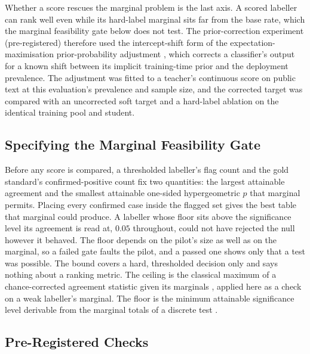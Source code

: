 Whether a score rescues the marginal problem is the last axis. A scored labeller can rank well
even while its hard-label marginal sits far from the base rate, which the marginal feasibility gate
below does not test. The prior-correction experiment (pre-registered) therefore used the
intercept-shift form of the expectation-maximisation prior-probability adjustment
\citep{saerens2002adjusting}, which corrects a classifier's output for a known shift between its
implicit training-time prior and the deployment prevalence. The adjustment was fitted to a teacher's continuous score on
public text at this evaluation's prevalence and sample size, and the corrected target was compared with an uncorrected soft target
and a hard-label ablation on the identical training pool and student.

\subsection{Specifying the Marginal Feasibility Gate}
\label{sec:m-feasgate}

Before any score is compared, a thresholded labeller's flag count and the gold standard's
confirmed-positive count fix two quantities: the largest attainable agreement and the smallest
attainable one-sided hypergeometric $p$ that marginal permits. Placing every confirmed case inside
the flagged set gives the best table that marginal could produce. A labeller whose floor sits
above the significance level its agreement is read at, $0.05$ throughout, could not have rejected the
null however it behaved. The floor depends on the pilot's size as well as on the marginal, so a
failed gate faults the pilot, and a passed one shows only that a test was possible. The bound covers a hard,
thresholded decision only and says nothing about a ranking metric. The ceiling is the classical maximum of a chance-corrected agreement
statistic given its marginals \citep{cohen1960kappa}, applied here as a check on a weak labeller's
marginal. The floor is the minimum attainable significance level derivable
from the marginal totals of a discrete test \citep{tarone1990modified}. 

\subsection{Pre-Registered Checks}
\label{sec:m-prereg}

